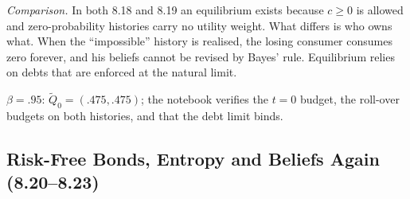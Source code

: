 \documentclass[12pt, letterpaper]{article}
\begin{document}
\begin{tcolorbox}[oddbox,title={Exercise 8.19 \quad Diverse beliefs, V}]
\emph{Comparison.} In both 8.18 and 8.19 an equilibrium exists because $c\ge0$ is allowed and zero-probability
histories carry no utility weight. What differs is who owns what. When the ``impossible'' history is realised,
the losing consumer consumes zero forever, and his beliefs cannot be revised by Bayes' rule. Equilibrium relies
on debts that are enforced at the natural limit.

\begin{tcolorbox}[databox]
$\beta=.95$: $\tilde Q_0=(.475,.475)$; the notebook verifies the $t=0$ budget, the roll-over budgets on both
histories, and that the debt limit binds.
\end{tcolorbox}
\end{tcolorbox}

\subsection{Risk-Free Bonds, Entropy and Beliefs Again (8.20--8.23)}
\end{document}
